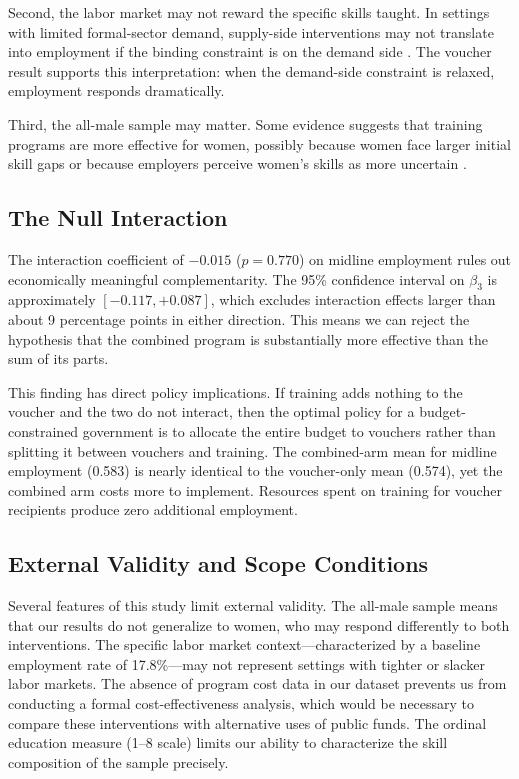 \documentclass[12pt]{article}
\begin{document}
Second, the labor market may not reward the specific skills taught. In settings with limited formal-sector demand, supply-side interventions may not translate into employment if the binding constraint is on the demand side \citep{crepon2013labor}. The voucher result supports this interpretation: when the demand-side constraint is relaxed, employment responds dramatically.

Third, the all-male sample may matter. Some evidence suggests that training programs are more effective for women, possibly because women face larger initial skill gaps or because employers perceive women's skills as more uncertain \citep{attanasio2011subsidizing}.

\subsection{The Null Interaction}

The interaction coefficient of $-0.015$ ($p = 0.770$) on midline employment rules out economically meaningful complementarity. The 95\% confidence interval on $\beta_3$ is approximately $[-0.117, +0.087]$, which excludes interaction effects larger than about 9 percentage points in either direction. This means we can reject the hypothesis that the combined program is substantially more effective than the sum of its parts.

This finding has direct policy implications. If training adds nothing to the voucher and the two do not interact, then the optimal policy for a budget-constrained government is to allocate the entire budget to vouchers rather than splitting it between vouchers and training. The combined-arm mean for midline employment (0.583) is nearly identical to the voucher-only mean (0.574), yet the combined arm costs more to implement. Resources spent on training for voucher recipients produce zero additional employment.

\subsection{External Validity and Scope Conditions}

Several features of this study limit external validity. The all-male sample means that our results do not generalize to women, who may respond differently to both interventions. The specific labor market context---characterized by a baseline employment rate of 17.8\%---may not represent settings with tighter or slacker labor markets. The absence of program cost data in our dataset prevents us from conducting a formal cost-effectiveness analysis, which would be necessary to compare these interventions with alternative uses of public funds. The ordinal education measure (1--8 scale) limits our ability to characterize the skill composition of the sample precisely.
\end{document}
